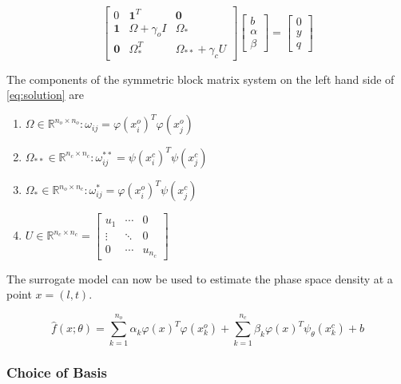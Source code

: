 \begin{equation}\label{eq:solution}
  \begin{bmatrix}
    0 & \mathbf{1}^{T} & \mathbf{0} \\ 
    \mathbf{1} & \Omega + \gamma_{o}I  & \Omega_*\\ 
    \mathbf{0} & \Omega_{*}^{T}  & \Omega_{**} + \gamma_{c}U 
  \end{bmatrix} \begin{bmatrix}
    b\\ 
    \alpha\\ 
    \beta
  \end{bmatrix} = \begin{bmatrix}
    0\\ 
    y\\ 
    q
  \end{bmatrix}
\end{equation}

The components of the symmetric block matrix system on the left hand side of 
\ref{eq:solution} are 
\begin{enumerate}
\item $\Omega \in \mathbb{R}^{n_{o} \times n_{o}}: \omega_{ij} = \varphi(x^{o}_{i})^{T} \varphi(x^{o}_{j})$
\item $\Omega_{**} \in \mathbb{R}^{n_{c} \times n_{c}}: \omega^{**}_{ij} = \psi(x^{c}_{i})^{T} \psi(x^{c}_{j})$
\item $\Omega_{*} \in \mathbb{R}^{n_{o} \times n_{c}}: \omega^{*}_{ij} = \varphi(x^{o}_{i})^{T} \psi(x^{c}_{j})$
\item $U \in \mathbb{R}^{n_{c} \times n_{c}} = \begin{bmatrix}
    u_1 & \cdots & 0 \\ 
    \vdots & \ddots  & 0\\ 
    0 & \cdots  & u_{n_{c}} 
  \end{bmatrix}$
\end{enumerate}

The surrogate model can now be used to estimate the phase space density 
at a point $x = (l,t)$.

\begin{equation}\label{eq:model}
\hat{f}(x;\theta) = \sum_{k = 1}^{n_{o}}{\alpha_{k}\varphi(x)^{T}\varphi(x^{o}_{k}) + \sum_{k = 1}^{n_{c}}}{\beta_{k} \varphi(x)^{T} \psi_{\theta}(x^{c}_{k})} + b
\end{equation}

\subsubsection*{Choice of Basis}

